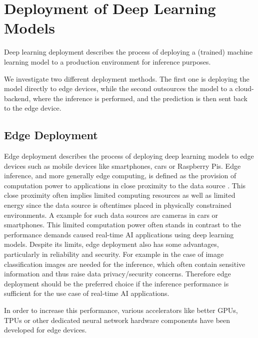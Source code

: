 \section{Deployment of Deep Learning Models}
Deep learning deployment describes the process of deploying a (trained) machine learning model to a production environment for inference purposes. 

We investigate two different deployment methods. The first one is deploying the model directly to edge devices, while the second outsources the model to a cloud-backend, where the inference is performed, and the prediction is then sent back to the edge device.
\subsection{Edge Deployment}
Edge deployment describes the process of deploying deep learning models to edge devices such as mobile devices like smartphones, cars or Raspberry Pis.
Edge inference, and more generally edge computing, is defined as the provision of computation power to applications in close proximity to the data source \cite{DBLP:journals/corr/abs-1808-05283}.
This close proximity often implies limited computing resources \cite{DBLP:journals/corr/abs-1811-11268} as well as limited energy since the data source is oftentimes placed in physically constrained environments. A example for such data sources are cameras in cars or smartphones.
This limited computation power often stands in contrast to the performance demands caused real-time AI applications using deep learning models.
Despite its limits, edge deployment also has some advantages, particularly in reliability and security. 
For example in the case of image classification images are needed for the inference, which often contain sensitive information and thus raise data privacy/security concerns.
Therefore edge deployment should be the preferred choice if the inference performance is sufficient for the use case of real-time AI applications.

In order to increase this performance, various accelerators like better GPUs, TPUs or other dedicated neural network hardware components have been developed for edge devices.



